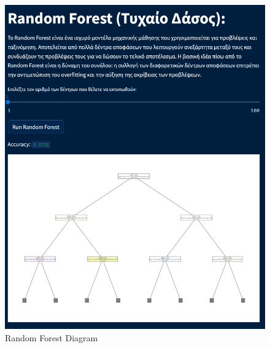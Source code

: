 \documentclass[unnumsec,webpdf,contemporary,large]{oup-authoring-template}%
\theoremstyle{thmstyleone}%
\theoremstyle{thmstyletwo}%
\theoremstyle{thmstylethree}%
\begin{document}
\begin{figure}
    \centering
    \includegraphics[width=1\linewidth]{images/random-forest.png}
    \caption{Random Forest Diagram}
    \label{fig:random-forest}
\end{figure}
\end{document}
